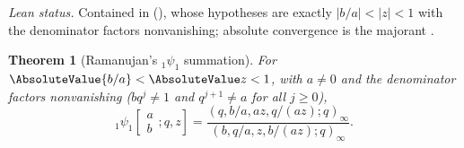 \documentclass[11pt,a4paper,oneside,openany]{book}
\newtheorem{theorem}{Theorem}[chapter]
\theoremstyle{definition}
\theoremstyle{remark}
\begin{document}
\emph{Lean status.}  Contained in 
(), whose hypotheses are exactly $|b/a|<|z|<1$ with the
denominator factors nonvanishing; absolute convergence is the majorant
.


\begin{theorem}[Ramanujan's ${}_1\psi_1$ summation]\label{thm:1psi1}
For $\AbsoluteValue{b/a}<\AbsoluteValue z<1$, with $a\ne0$ and the denominator factors
nonvanishing ($bq^{j}\ne1$ and $q^{j+1}\ne a$ for all $j\ge0$),
\[
 {}_1\psi_1\!\left[\begin{matrix}a\\b\end{matrix};q,z\right]
 =\frac{(q,b/a,az,q/(az);q)_\infty}
 {(b,q/a,z,b/(az);q)_\infty}.
\]
\end{theorem}
\end{document}
